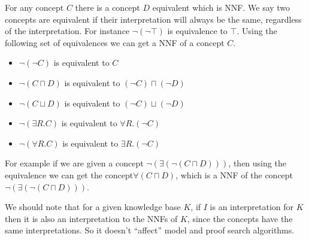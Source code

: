 For any concept $C$ there is a concept $D$ equivalent which is NNF. We
say two concepts are equivalent if their interpretation will always be
the same, regardless of the interpretation. For instance $\neg
(\neg \top)$ is equivalence to $\top$. Using the following set of
equivalences we can get a NNF of a concept $C$.

\begin{itemize}
\item $\neg (\neg C)$ is equivalent to $C$
\item $\neg (C \sqcap D)$ is equivalent to $(\neg C) \sqcap (\neg D)$
\item $\neg (C \sqcup D)$ is equivalent to $(\neg C) \sqcup (\neg D)$
\item $\neg (\exists R . C)$ is equivalent to $\forall R . (\neg C)$
\item $\neg (\forall R . C)$ is equivalent to $\exists R . (\neg C)$
\end{itemize}

For example if we are given a concept $\neg (\exists (\neg (C \sqcap
D)))$, then using the equivalence we can get the concept$\forall
(C \sqcap D)$, which is a NNF of the concept $\neg (\exists (\neg
(C \sqcap D)))$.

We should note that for a given knowledge base $K$, if $I$ is an
interpretation for $K$ then it is also an interpretation to the NNFs
of $K$, since the concepts have the same interpretations. So it 
doesn't ``affect'' model and proof search algorithms.

